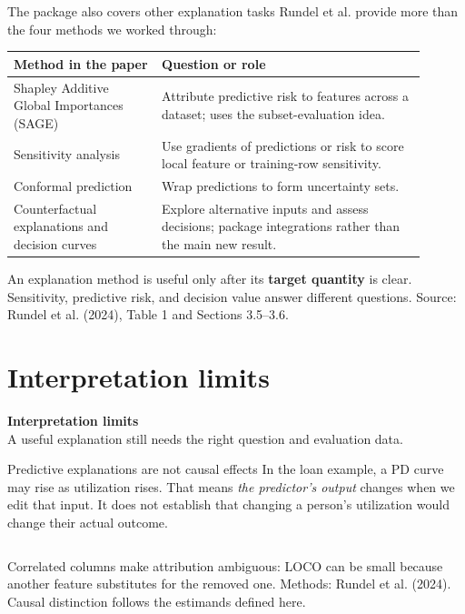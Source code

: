 \documentclass[aspectratio=169]{beamer}
\begin{document}
\begin{frame}{The package also covers other explanation tasks}
  \small
  Rundel et al. provide more than the four methods we worked through:
  \vskip 8pt
  \begin{tabular}{L{0.32\linewidth}L{0.58\linewidth}}
    \textbf{Method in the paper} & \textbf{Question or role}\\[3pt]\hline
    Shapley Additive Global Importances (SAGE) & Attribute predictive risk to
      features across a dataset; uses the subset-evaluation idea.\\[5pt]
    Sensitivity analysis & Use gradients of predictions or risk to score local
      feature or training-row sensitivity.\\[5pt]
    Conformal prediction & Wrap predictions to form uncertainty sets.\\[5pt]
    Counterfactual explanations and decision curves & Explore alternative inputs
      and assess decisions; package integrations rather than the main new result.
  \end{tabular}
  \vskip 9pt
  An explanation method is useful only after its \textbf{target quantity} is clear.
  Sensitivity, predictive risk, and decision value answer different questions.
  \vskip 4pt
  {\scriptsize Source: Rundel et al. (2024), Table 1 and Sections 3.5--3.6.}
\end{frame}

\section{Interpretation limits}
\begin{frame}[plain]
  \vfill\centering
  {\Large\color{popblue}\textbf{Interpretation limits}}\\[9pt]
  {\small A useful explanation still needs the right question and evaluation data.}
  \vfill
\end{frame}

\begin{frame}{Predictive explanations are not causal effects}
  \small
  In the loan example, a PD curve may rise as utilization rises. That means
  \emph{the predictor's output} changes when we edit that input. It does not
  establish that changing a person's utilization would change their actual outcome.
  \vskip 10pt
  \begin{columns}[T]
  \end{columns}
  \vskip 10pt
  Correlated columns make attribution ambiguous: LOCO can be small because
  another feature substitutes for the removed one.
  \vskip 4pt
  {\scriptsize Methods: Rundel et al. (2024). Causal distinction follows the estimands defined here.}
\end{frame}
\end{document}
